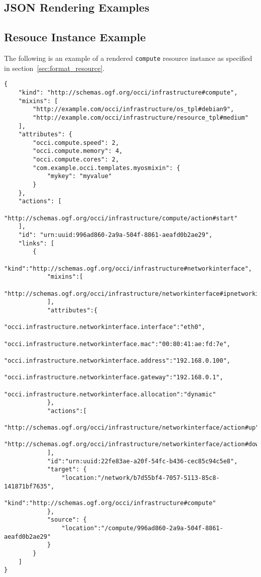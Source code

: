 \documentclass[10pt,a4paper]{article}
\begin{document}
\clearpage
\begin{appendices}

\lstset{
   language=json,
   basicstyle=\footnotesize,
   xleftmargin=0.0cm
}

\section{JSON Rendering Examples}
\subsection{Resouce Instance Example}
\label{resouce_instance_rendering_example}

The following is an example of a rendered \texttt{compute} resource instance as specified in section~\ref{sec:format_resource}.

\begin{lstlisting}
{
    "kind": "http://schemas.ogf.org/occi/infrastructure#compute",
    "mixins": [
        "http://example.com/occi/infrastructure/os_tpl#debian9",
        "http://example.com/occi/infrastructure/resource_tpl#medium"
    ],
    "attributes": {
        "occi.compute.speed": 2,
        "occi.compute.memory": 4,
        "occi.compute.cores": 2,
        "com.example.occi.templates.myosmixin": {
            "mykey": "myvalue"
        }
    },
    "actions": [
        "http://schemas.ogf.org/occi/infrastructure/compute/action#start"
    ],
    "id": "urn:uuid:996ad860-2a9a-504f-8861-aeafd0b2ae29",
    "links": [
        {
            "kind":"http://schemas.ogf.org/occi/infrastructure#networkinterface",
            "mixins":[
                "http://schemas.ogf.org/occi/infrastructure/networkinterface#ipnetworkinterface"
            ],
            "attributes":{
                "occi.infrastructure.networkinterface.interface":"eth0",
                "occi.infrastructure.networkinterface.mac":"00:80:41:ae:fd:7e",
                "occi.infrastructure.networkinterface.address":"192.168.0.100",
                "occi.infrastructure.networkinterface.gateway":"192.168.0.1",
                "occi.infrastructure.networkinterface.allocation":"dynamic"
            },
            "actions":[
                "http://schemas.ogf.org/occi/infrastructure/networkinterface/action#up",
                "http://schemas.ogf.org/occi/infrastructure/networkinterface/action#down"
            ],
            "id":"urn:uuid:22fe83ae-a20f-54fc-b436-cec85c94c5e8",
            "target": {
                "location:"/network/b7d55bf4-7057-5113-85c8-141871bf7635",
                "kind":"http://schemas.ogf.org/occi/infrastructure#compute"
            },
            "source": {
                "location":"/compute/996ad860-2a9a-504f-8861-aeafd0b2ae29"
            }
        }
    ]
}
\end{lstlisting}


\end{appendices}
\end{document}
